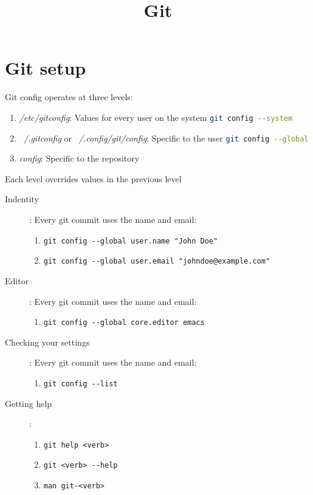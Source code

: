 \documentclass[french]{article}
\title{Git}
\begin{document}
\date{}

\maketitle

\setlength{\parindent}{0cm}

\section{Git setup}

Git config operates at three levels:
\begin{enumerate}
    \item \emph{/etc/gitconfig}: Values for every user on the system \lstinline[language=bash]{git config --system}
    \item \emph{~/.gitconfig} or \emph{~/.config/git/config}: Specific to the user \lstinline[language=bash]{git config --global}
    \item \emph{config}: Specific to the repository
\end{enumerate}
Each level overrides values in the previous level

\begin{description}
    \item[Indentity]: Every git commit uses the name and email:
        \begin{enumerate}
            \item[-] \lstinline{git config --global user.name "John Doe"}
            \item[-] \lstinline{git config --global user.email "johndoe@example.com"}
        \end{enumerate}
    \item[Editor]: Every git commit uses the name and email:
        \begin{enumerate}
            \item[-] \lstinline{git config --global core.editor emacs}
        \end{enumerate}
    \item[Checking your settings]: Every git commit uses the name and email:
        \begin{enumerate}
            \item[-] \lstinline{git config --list}
        \end{enumerate}
    \item[Getting help]:
        \begin{enumerate}
            \item[-] \lstinline{git help <verb>}
            \item[-] \lstinline{git <verb> --help}
            \item[-] \lstinline{man git-<verb>}
        \end{enumerate}
\end{description}
\end{document}
